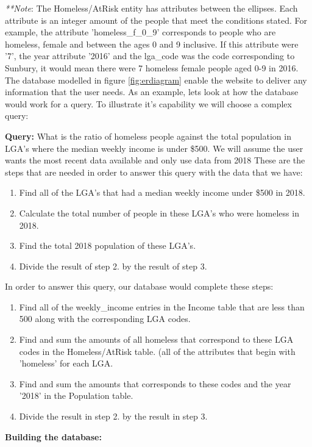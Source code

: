 \documentclass[12pt, a4paper]{article}
\begin{document}
\emph{**Note}: The Homeless/AtRisk entity has attributes between the ellipses. Each attribute is an integer amount of the people that meet the conditions stated. For example, the attribute 'homeless\_f\_0\_9' corresponds to people who are homeless, female and between the ages 0 and 9 inclusive. If this attribute were '7', the year attribute '2016' and the lga\_code was the code corresponding to Sunbury, it would mean there were 7 homeless female people aged 0-9 in 2016.\\

The database modelled in figure \ref{fig:erdiagram} enable the website to deliver any information that the user needs. As an example, lets look at how the database would work for a query. To illustrate it's capability we will choose a complex query:

\textbf{Query:} What is the ratio of homeless people against the total population in LGA's where the median weekly income is under \$500. We will assume the user wants the most recent data available and only use data from 2018
These are the steps that are needed in order to answer this query with the data that we have:
\begin{enumerate}
\item Find all of the LGA's that had a median weekly income under \$500 in 2018.
\item Calculate the total number of people in these LGA's who were homeless in 2018.
\item Find the total 2018 population of these LGA's.
\item Divide the result of step 2. by the result of step 3.
\end{enumerate}
In order to answer this query, our database would complete these steps:
\begin{enumerate}
\item Find all of the weekly\_income entries in the Income table that are less than 500 along with the corresponding LGA codes.
\item Find and sum the amounts of all homeless that correspond to these LGA codes in the Homeless/AtRisk table. (all of the attributes that begin with 'homeless' for each LGA.
\item Find and sum the amounts that corresponds to these codes and the year '2018' in the Population table.
\item Divide the result in step 2. by the result in step 3.
\end{enumerate} 

\textbf{Building the database:} 
\end{document}
